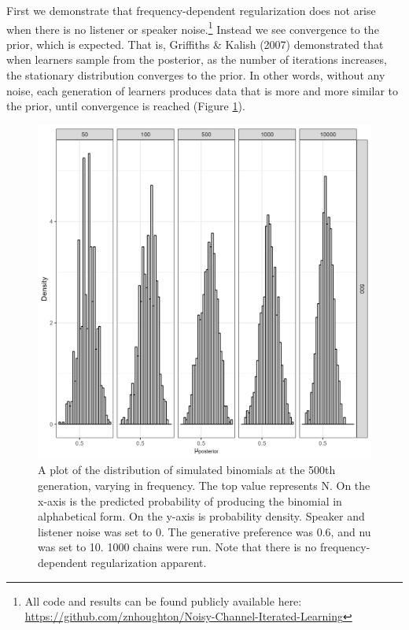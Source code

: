 \documentclass[10pt, letterpaper]{article}
\newenvironment{CodeChunk}{}{}
\begin{document}
First we demonstrate that frequency-dependent regularization does not
arise when there is no listener or speaker noise.\footnote{All code and
  results can be found publicly available here:
  \url{https://github.com/znhoughton/Noisy-Channel-Iterated-Learning}}
Instead we see convergence to the prior, which is expected. That is,
Griffiths \& Kalish (2007) demonstrated that when learners sample from
the posterior, as the number of iterations increases, the stationary
distribution converges to the prior. In other words, without any noise,
each generation of learners produces data that is more and more similar
to the prior, until convergence is reached (Figure
\ref{fig:noNoisePlot}).

\begin{CodeChunk}
\begin{figure}[tb]

{\centering \includegraphics[width=1\linewidth]{Figures/noNoise} 

}

\caption[A plot of the distribution of simulated binomials at the 500th generation, varying in frequency]{A plot of the distribution of simulated binomials at the 500th generation, varying in frequency. The top value represents N. On the x-axis is the predicted probability of producing the binomial in alphabetical form. On the y-axis is probability density. Speaker and listener noise was set to 0. The generative preference was 0.6, and nu was set to 10. 1000 chains were run. Note that there is no frequency-dependent regularization apparent.}\label{fig:noNoisePlot}
\end{figure}
\end{CodeChunk}
\end{document}
